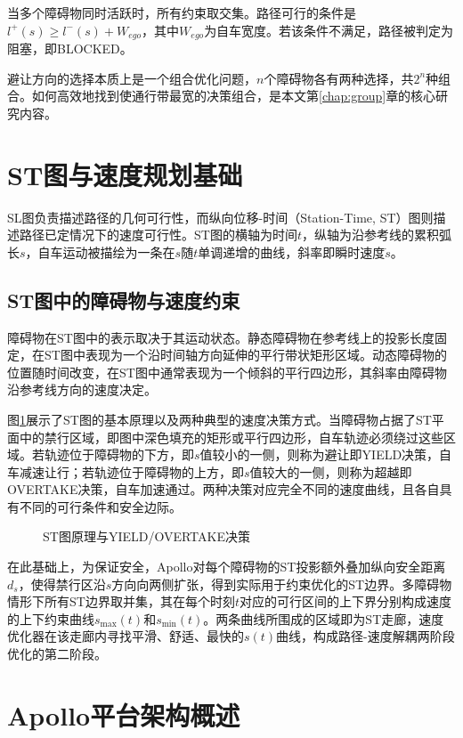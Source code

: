 当多个障碍物同时活跃时，所有约束取交集。路径可行的条件是$l^+(s) \geq l^-(s) + W_{ego}$，其中$W_{ego}$为自车宽度。若该条件不满足，路径被判定为阻塞，即BLOCKED。

避让方向的选择本质上是一个组合优化问题，$n$个障碍物各有两种选择，共$2^n$种组合。如何高效地找到使通行带最宽的决策组合，是本文第\ref{chap:group}章的核心研究内容。

\section{ST图与速度规划基础}

SL图负责描述路径的几何可行性，而纵向位移-时间（Station-Time, ST）图则描述路径已定情况下的速度可行性。ST图的横轴为时间$t$，纵轴为沿参考线的累积弧长$s$，自车运动被描绘为一条在$s$随$t$单调递增的曲线，斜率即瞬时速度$\dot{s}$。

\subsection{ST图中的障碍物与速度约束}

障碍物在ST图中的表示取决于其运动状态。静态障碍物在参考线上的投影长度固定，在ST图中表现为一个沿时间轴方向延伸的平行带状矩形区域。动态障碍物的位置随时间改变，在ST图中通常表现为一个倾斜的平行四边形，其斜率由障碍物沿参考线方向的速度决定。

图\ref{fig:st_graph}展示了ST图的基本原理以及两种典型的速度决策方式。当障碍物占据了ST平面中的禁行区域，即图中深色填充的矩形或平行四边形，自车轨迹必须绕过这些区域。若轨迹位于障碍物的下方，即$s$值较小的一侧，则称为避让即YIELD决策，自车减速让行；若轨迹位于障碍物的上方，即$s$值较大的一侧，则称为超越即OVERTAKE决策，自车加速通过。两种决策对应完全不同的速度曲线，且各自具有不同的可行条件和安全边际。

\begin{figure}[htbp]
\centering
{}
\caption{ST图原理与YIELD/OVERTAKE决策}
\label{fig:st_graph}
\end{figure}

在此基础上，为保证安全，Apollo对每个障碍物的ST投影额外叠加纵向安全距离$d_s$，使得禁行区沿$s$方向向两侧扩张，得到实际用于约束优化的ST边界。多障碍物情形下所有ST边界取并集，其在每个时刻$t$对应的可行区间的上下界分别构成速度的上下约束曲线$s_{\max}(t)$和$s_{\min}(t)$。两条曲线所围成的区域即为ST走廊，速度优化器在该走廊内寻找平滑、舒适、最快的$s(t)$曲线，构成路径-速度解耦两阶段优化的第二阶段。

\section{Apollo平台架构概述}

